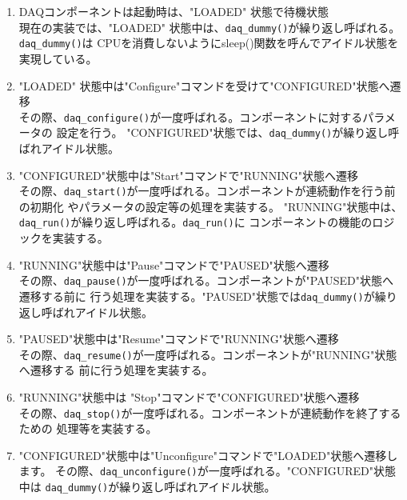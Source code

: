\documentclass[a4j,10pt,dvips,onecolumn,oneside,final]{jarticle}%
\begin{document}
\begin{enumerate}
\item DAQコンポーネントは起動時は、"LOADED" 状態で待機状態\\
  現在の実装では、"LOADED" 状態中は、\verb|daq_dummy()|が繰り返し呼ばれる。
  \verb|daq_dummy()|は
  CPUを消費しないようにsleep()関数を呼んでアイドル状態を実現している。

\item "LOADED" 状態中は"Configure"コマンドを受けて"CONFIGURED"状態へ遷移\\
  その際、\verb|daq_configure()|が一度呼ばれる。コンポーネントに対するパラメータの
  設定を行う。
  "CONFIGURED"状態では、\verb|daq_dummy()|が繰り返し呼ばれアイドル状態。

\item "CONFIGURED"状態中は"Start"コマンドで"RUNNING"状態へ遷移\\
  その際、\verb|daq_start()|が一度呼ばれる。コンポーネントが連続動作を行う前の初期化
  やパラメータの設定等の処理を実装する。
  "RUNNING"状態中は、\verb|daq_run()|が繰り返し呼ばれる。\verb|daq_run()|に
  コンポーネントの機能のロジックを実装する。

\item "RUNNING"状態中は"Pause"コマンドで"PAUSED"状態へ遷移\\
  その際、\verb|daq_pause()|が一度呼ばれる。コンポーネントが"PAUSED"状態へ遷移する前に
  行う処理を実装する。"PAUSED"状態では\verb|daq_dummy()|が繰り返し呼ばれアイドル状態。

\item "PAUSED"状態中は"Resume"コマンドで"RUNNING"状態へ遷移\\
  その際、\verb|daq_resume()|が一度呼ばれる。コンポーネントが"RUNNING"状態へ遷移する
  前に行う処理を実装する。

\item "RUNNING"状態中は "Stop"コマンドで"CONFIGURED"状態へ遷移\\
  その際、\verb|daq_stop()|が一度呼ばれる。コンポーネントが連続動作を終了するための
  処理等を実装する。

\item "CONFIGURED"状態中は"Unconfigure"コマンドで"LOADED"状態へ遷移します。
  その際、\verb|daq_unconfigure()|が一度呼ばれる。"CONFIGURED"状態中は
  \verb|daq_dummy()|が繰り返し呼ばれアイドル状態。
\end{enumerate}
\end{document}
